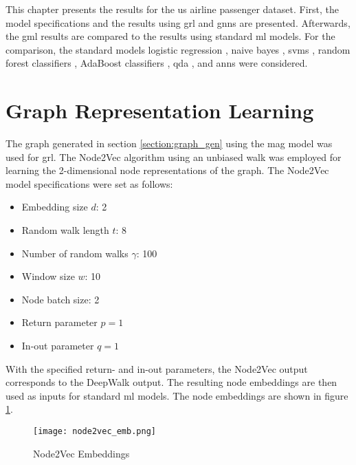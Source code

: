   
  This chapter presents the results for the \acs{us} airline passenger dataset. 
  First, the model specifications and the results using \acs{grl} and \acsp{gnn} 
  are presented. Afterwards, the \acs{gml} results are compared to the results 
  using standard \acs{ml} models. For the comparison, the standard models 
  logistic regression \citep{cramer2002origins}, naive bayes 
  \citep{zhang2004bayes}, \acsp{svm} \citep{platt1999probabilistic,chang2011libsvm}, 
  random forest classifiers \citep{breiman2001random}, AdaBoost classifiers 
  \citep{freund1997decision,hastie2009multi}, \acs{qda}
  \citep{tharwat2016linear}, and \acsp{ann}
  \citep{mcculloch1943logical,werbos1974beyond} were considered.

  \section{Graph Representation Learning}
  \label{section:result_n2v}

  The graph generated in section \ref{section:graph_gen} using the \acs{mag}
  model was used for \acs{grl}. The Node2Vec algorithm using an unbiased walk 
  was employed for learning the 2-dimensional node representations 
  of the graph. The Node2Vec model specifications were set as follows:

  \begin{itemize}
    \setlength\itemsep{0.1em}
    \item Embedding size $d$: 2
    \item Random walk length $t$: 8
    \item Number of random walks $\gamma$: 100
    \item Window size $w$: 10
    \item Node batch size: 2
    \item Return parameter $p=1$
    \item In-out parameter $q=1$
  \end{itemize}

  \noindent With the specified return- and in-out parameters, the Node2Vec
  output corresponds to the DeepWalk output. The resulting node embeddings are
  then used as inputs for standard \acs{ml} models. The node embeddings are 
  shown in figure \ref{fig:node2vec}. 

  \begin{figure}[h]
		\centering
		\texttt{[image: node2vec\_emb.png]}
		\caption{Node2Vec Embeddings}
        \label{fig:node2vec}
  \end{figure}

